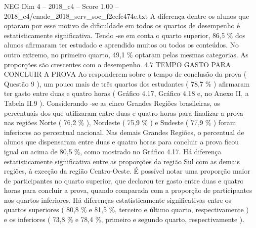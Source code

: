 \begin{textsample}{NEG Dim 4 – 2018\_c4 – Score 1.00 – 2018\_c4/enade\_2018\_serv\_soc\_f2ecfc474e.txt}
A diferença dentre os alunos que optaram por esse motivo de dificuldade em todos os quartos de desempenho é estatisticamente significativa.
Tendo -se em conta o quarto superior, 86,5 \% dos alunos afirmaram ter estudado e aprendido muitos ou todos os conteúdos.
No outro extremo, no primeiro quarto, 49,1 \% optaram pelas mesmas categorias.
As proporções são crescentes com o desempenho. 4.7 TEMPO GASTO PARA CONCLUIR A PROVA Ao responderem sobre o tempo de conclusão da prova ( Questão 9 ), um pouco mais de três quartos dos estudantes ( 78,7 \% ) afirmaram ter gasto entre duas e quatro horas ( Gráfico 4.17, Gráfico 4.18 e, no Anexo II, a Tabela II.9 ).
Considerando -se as cinco Grandes Regiões brasileiras, os percentuais dos que utilizaram entre duas e quatro horas para finalizar a prova nas regiões Norte ( 76,2 \% ), Nordeste ( 75,9 \% ) e Sudeste ( 77,9 \% ) foram inferiores ao percentual nacional.
Nas demais Grandes Regiões, o percentual de alunos que dispensaram entre duas e quatro horas para concluir a prova ficou igual ou acima de 80,5 \%, como mostrado no Gráfico 4.17.
Há diferença estatisticamente significativa entre as proporções da região Sul com as demais regiões, à exceção da região Centro-Oeste.
É possível notar uma proporção maior de participantes no quarto superior, que declarou ter gasto entre duas e quatro horas para concluir a prova, quando comparada com a proporção de participantes nos quartos inferiores.
Há diferenças estatisticamente significativas entre os quartos superiores ( 80,8 \% e 81,5 \%, terceiro e último quarto, respectivamente ) e os inferiores ( 73,8 \% e 78,4 \%, primeiro e segundo quarto, respectivamente ).

\end{textsample}
